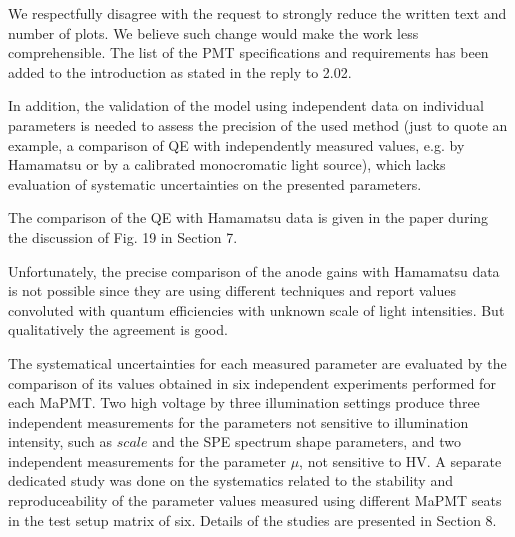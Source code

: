 \documentclass[11pt]{report}
\begin{document}
We respectfully disagree with the request to strongly reduce the written text and number of plots.
We believe such change would make the work less comprehensible.
The list of the PMT specifications and requirements has been added to the introduction as stated in the reply to 2.02.

\begin{tcolorbox}[enlarge top by=2em,colbacktitle=black!60!white,colframe=black!80!white,left=0pt,right=0pt,top=0pt,bottom=0pt,boxrule=0.3pt,title=\bfseries2.12]
In addition, the validation of the model using independent data on individual parameters is needed to assess the precision of the used method (just to quote an example, a comparison of QE with independently measured values, e.g. by Hamamatsu or by a calibrated monocromatic light source), which lacks evaluation of systematic uncertainties on the presented parameters.
\end{tcolorbox}


The comparison of the QE with Hamamatsu data is given in the paper during the discussion of Fig. 19 in Section 7.


Unfortunately, the precise comparison of the anode gains with Hamamatsu data is not possible since they are using different techniques and report values convoluted with quantum efficiencies with unknown scale of light intensities. But qualitatively the agreement is good.

The systematical uncertainties for each measured parameter are evaluated by the comparison of its values obtained in six independent experiments performed for each MaPMT. Two high voltage by three illumination settings produce three independent measurements for the parameters not sensitive to illumination intensity, such as $scale$ and the SPE spectrum shape parameters, and two independent measurements for the parameter $\mu$, not sensitive to HV. A separate dedicated study was done on the systematics related to the stability and reproduceability of the parameter values measured using different MaPMT seats in the test setup matrix of six. Details of the studies are presented in Section 8.



\clearpage




\begin{tcolorbox}[enlarge top by=2em,colbacktitle=black!60!white,colframe=black!80!white,left=0pt,right=0pt,top=0pt,bottom=0pt,boxrule=0.3pt,title=\bfseries Addition 1]
\end{tcolorbox}
\end{document}
